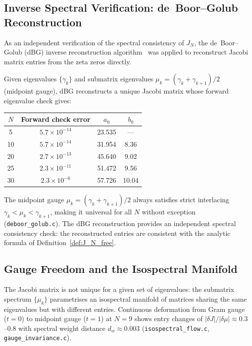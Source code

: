 \documentclass{pre-aomart}
\theoremstyle{plain}
\theoremstyle{definition}
\theoremstyle{remark}
\begin{document}
\subsection{Inverse Spectral Verification: de~Boor--Golub Reconstruction}

As an independent verification of the spectral consistency of $J_N$,
the de~Boor--Golub (dBG) inverse reconstruction algorithm~\cite{deBoorGolub1978} was applied
to reconstruct Jacobi matrix entries from the zeta zeros directly.

Given eigenvalues $\{\gamma_k\}$ and submatrix eigenvalues
$\mu_k = (\gamma_k + \gamma_{k+1})/2$ (midpoint gauge), dBG reconstructs
a unique Jacobi matrix whose forward eigenvalue check gives:

\begin{center}
\small
\begin{tabular}{cccc}
\toprule
$N$ & Forward check error & $a_0$ & $b_0$ \\
\midrule
 5 & $5.7 \times 10^{-14}$ & 23.535 & --- \\
10 & $5.7 \times 10^{-14}$ & 31.954 & 8.36 \\
20 & $2.7 \times 10^{-13}$ & 45.640 & 9.02 \\
25 & $2.3 \times 10^{-11}$ & 51.472 & 9.56 \\
30 & $2.3 \times 10^{-6}$  & 57.726 & 10.04 \\
\bottomrule
\end{tabular}
\end{center}

\noindent The midpoint gauge $\mu_k = (\gamma_k + \gamma_{k+1})/2$ always
satisfies strict interlacing $\gamma_k < \mu_k < \gamma_{k+1}$, making it
universal for all $N$ without exception (\texttt{deboor\_golub.c}).
The dBG reconstruction provides an independent spectral consistency
check: the reconstructed entries are consistent with the analytic
formula of Definition~\ref{def:J_N_free}.

\subsection{Gauge Freedom and the Isospectral Manifold}

The Jacobi matrix is not unique for a given set of eigenvalues:
the submatrix spectrum $\{\mu_k\}$ parametrises an isospectral manifold
of matrices sharing the same eigenvalues but with different entries.
Continuous deformation from Gram gauge ($t=0$) to midpoint gauge
($t=1$) at $N=9$ shows entry changes of $|\delta J|/|\delta\mu| \approx 0.3$--$0.8$
with spectral weight distance $d_w \approx 0.003$
(\texttt{isospectral\_flow.c}, \texttt{gauge\_invariance.c}).
\end{document}
